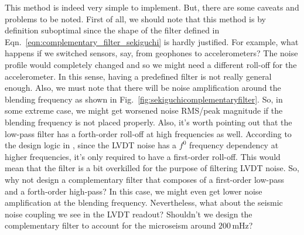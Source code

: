 This method is indeed very simple to implement.
But, there are some caveats and problems to be noted.
First of all, we should note that this method is by definition suboptimal since the shape of the filter defined in Eqn.~\eqref{eqn:complementary_filter_sekiguchi} is hardly justified.
For example, what happens if we switched sensors, say, from geophones to accelerometers?
The noise profile would completely changed and so we might need a different roll-off for the accelerometer.
In this sense, having a predefined filter is not really general enough.
Also, we must note that there will be noise amplification around the blending frequency as shown in Fig.~\ref{fig:sekiguchicomplementaryfilter}.
So, in some extreme case, we might get worsened noise RMS/peak magnitude if the blending frequency is not placed properly.
Also, it's worth pointing out that the low-pass filter has a forth-order roll-off at high frequencies as well.
According to the design logic in \cite{Sekiguchi:2016bmv}, since the LVDT noise has a $f^{0}$ frequency dependency at higher frequencies, it's only required to have a first-order roll-off.
This would mean that the filter is a bit overkilled for the purpose of filtering LVDT noise.
So, why not design a complementary filter that composes of a first-order low-pass and a forth-order high-pass?
In this case, we might even get lower noise amplification at the blending frequency.
Nevertheless, what about the seismic noise coupling we see in the LVDT readout?
Shouldn't we design the complementary filter to account for the microseism around $200\,\mathrm{mHz}$?

